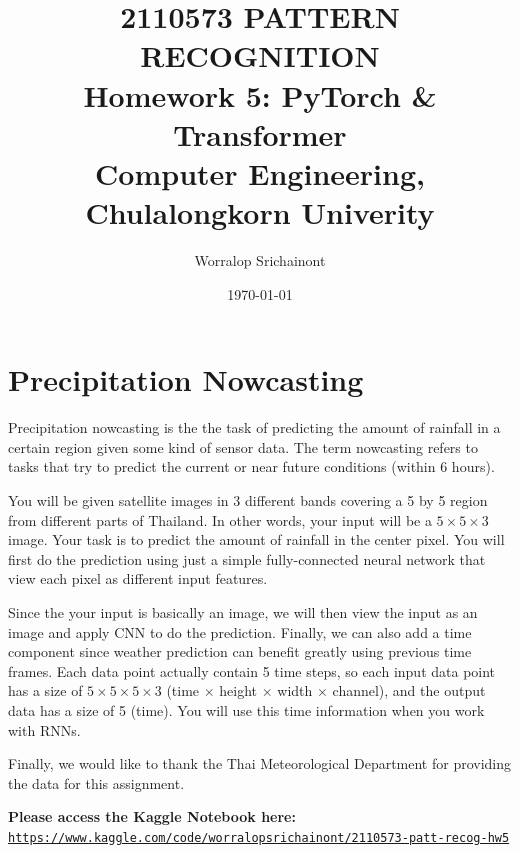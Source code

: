 \documentclass[12pt, a4paper]{article}
\title {
	\textbf{2110573 PATTERN RECOGNITION} \\
    \vspace{1em}
	\Large{\textbf{Homework 5: PyTorch \& Transformer}} \\
    \vspace{0.5em}
    \large{Computer Engineering, Chulalongkorn Univerity}
}
\author{Worralop Srichainont}
\date{\today}
\begin{document}
    \maketitle
    \thispagestyle{empty}
    \clearpage

    \tableofcontents
    \thispagestyle{empty}
    \clearpage


    \part{Precipitation Nowcasting}
        Precipitation nowcasting is the the task of predicting the amount of rainfall
        in a certain region given some kind of sensor data.
        The term nowcasting refers to tasks that try to predict the current or near future conditions
        (within 6 hours).

        \vspace{0.5em}

        You will be given satellite images in 3 different bands covering a 5 by 5 region from different parts of Thailand.
        In other words, your input will be a $5 \times 5 \times 3$ image.
        Your task is to predict the amount of rainfall in the center pixel.
        You will first do the prediction using just a simple fully-connected neural network that view each pixel as different input features.

        \vspace{0.5em}

        Since the your input is basically an image, we will then view the input as an image and apply CNN to do the prediction.
        Finally, we can also add a time component since weather prediction can benefit greatly using previous time frames.
        Each data point actually contain 5 time steps, so each input data point has a size of $5 \times 5 \times 5 \times 3$
        (time $\times$ height $\times$ width $\times$ channel), and the output data has a size of 5 (time).
        You will use this time information when you work with RNNs.

        \vspace{0.5em}

        Finally, we would like to thank the Thai Meteorological Department for providing the data for this assignment.

        \vspace{1em}

        \textbf{Please access the Kaggle Notebook here:} \texttt{\url{https://www.kaggle.com/code/worralopsrichainont/2110573-patt-recog-hw5}}
\end{document}
